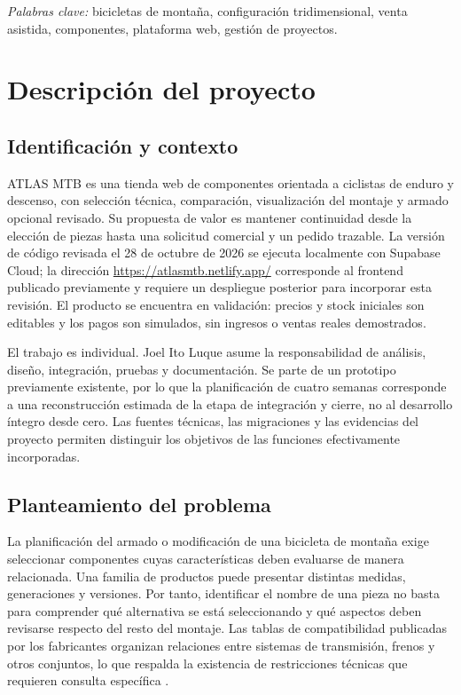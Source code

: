 \documentclass[12pt,letterpaper]{article}
\newcommand{\pagina}{\clearpage}
\begin{document}
\indent\textit{Palabras clave:} bicicletas de montaña, configuración tridimensional, venta asistida, componentes, plataforma web, gestión de proyectos.
\pagina
\tableofcontents
\pagina
\listoftables
\pagina
\listoffigures
\pagina

\section{Descripción del proyecto}
\subsection{Identificación y contexto}
ATLAS MTB es una tienda web de componentes orientada a ciclistas de enduro y descenso, con selección técnica, comparación, visualización del montaje y armado opcional revisado. Su propuesta de valor es mantener continuidad desde la elección de piezas hasta una solicitud comercial y un pedido trazable. La versión de código revisada el 28 de octubre de 2026 se ejecuta localmente con Supabase Cloud; la dirección \url{https://atlasmtb.netlify.app/} corresponde al frontend publicado previamente y requiere un despliegue posterior para incorporar esta revisión. El producto se encuentra en validación: precios y stock iniciales son editables y los pagos son simulados, sin ingresos o ventas reales demostrados.

El trabajo es individual. Joel Ito Luque asume la responsabilidad de análisis, diseño, integración, pruebas y documentación. Se parte de un prototipo previamente existente, por lo que la planificación de cuatro semanas corresponde a una reconstrucción estimada de la etapa de integración y cierre, no al desarrollo íntegro desde cero. Las fuentes técnicas, las migraciones y las evidencias del proyecto permiten distinguir los objetivos de las funciones efectivamente incorporadas.

\subsection{Planteamiento del problema}
La planificación del armado o modificación de una bicicleta de montaña exige seleccionar componentes cuyas características deben evaluarse de manera relacionada. Una familia de productos puede presentar distintas medidas, generaciones y versiones. Por tanto, identificar el nombre de una pieza no basta para comprender qué alternativa se está seleccionando y qué aspectos deben revisarse respecto del resto del montaje. Las tablas de compatibilidad publicadas por los fabricantes organizan relaciones entre sistemas de transmisión, frenos y otros conjuntos, lo que respalda la existencia de restricciones técnicas que requieren consulta específica \citep{shimano,sram}.
\end{document}
